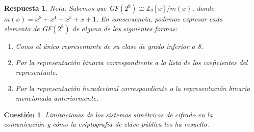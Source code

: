\documentclass[
  a4paper,
  spanish,
  12pt,
]{scrartcl}
\theoremstyle{ejercicio-style}
\newtheorem{ejer}{Cuestión}
\theoremstyle{remark-style}
\newtheorem*{sol}{Respuesta}
\theoremstyle{teorema-style}
\begin{document}
\begin{sol}
\textit{Nota.} Sabemos que GF$(2^8) \cong \mathbb Z_2[x] /m(x)$, donde $m(x) = x^8 + x^4 + x^3 + x + 1$. En consecuencia, podemos expresar cada elemento de GF$(2^8)$ de alguna de las siguientes formas:
\begin{enumerate}
  \item Como el único representante de su clase de grado inferior a 8.
  \item Por la representación binaria correspondiente a la lista de los coeficientes del representante.
  \item Por la representación hexadecimal correspondiente a la representación binaria mencionada anteriormente.
\end{enumerate}
\end{sol}

\begin{ejer}
  Limitaciones de los sistemas simétricos de cifrado en la comunicación y cómo la criptografía de clave pública los ha resuelto.
\end{ejer}
\end{document}
